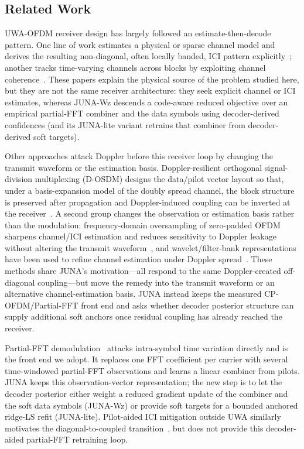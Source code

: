 \documentclass[journal]{IEEEtran}
\newcommand{\juna}{JUNA}
\newcommand{\junalite}{JUNA-lite}
\newcommand{\junawz}{JUNA-Wz}
\begin{document}
\subsection{Related Work}\label{sec:related}
UWA-OFDM receiver design has largely followed an estimate-then-decode pattern.
One line of work estimates a physical or sparse channel model and derives the
resulting non-diagonal, often locally banded, ICI pattern
explicitly~\cite{berger2010sparse}; another tracks time-varying channels across
blocks by exploiting channel coherence~\cite{zwang2012clustered}. These papers
explain the physical source of the problem studied here, but they are not the
same receiver architecture: they seek explicit channel or ICI estimates, whereas
\junawz{} descends a code-aware reduced objective over an empirical partial-FFT
combiner and the data symbols using decoder-derived confidences (and its
\junalite{}
variant retrains that combiner from decoder-derived soft targets).

Other approaches attack Doppler before this receiver loop by changing the
transmit waveform or the estimation basis. Doppler-resilient orthogonal
signal-division multiplexing (D-OSDM) designs the data/pilot vector layout so
that, under a basis-expansion model of the doubly spread channel, the block
structure is preserved after propagation and Doppler-induced coupling can be
inverted at the receiver~\cite{ebihara2016dosdm}. A second group changes the
observation or estimation basis rather than the modulation: frequency-domain
oversampling of zero-padded OFDM sharpens channel/ICI estimation and reduces
sensitivity to Doppler leakage without altering the transmit
waveform~\cite{wang2012fdoversampling}, and wavelet/filter-bank representations
have been used to refine channel estimation under Doppler
spread~\cite{tang2018haarwavelet}. These methods share \juna{}'s
motivation---all respond to the same Doppler-created off-diagonal coupling---but
move the remedy into the transmit waveform or an alternative channel-estimation
basis. \juna{} instead keeps the measured CP-OFDM/Partial-FFT front end and asks
whether decoder posterior structure can supply additional soft anchors once
residual coupling has already reached the receiver.

Partial-FFT demodulation~\cite{yerramalli2012partialfft} attacks intra-symbol
time variation directly and is the front end we adopt. It replaces one FFT
coefficient per carrier with several time-windowed partial-FFT observations and learns a
linear combiner from pilots. \juna{} keeps this observation-vector representation; the new
step is to let the decoder posterior either weight a reduced gradient update of
the combiner and the soft data symbols (\junawz{}) or provide soft targets for a
bounded anchored ridge-LS refit (\junalite{}). Pilot-aided ICI mitigation outside UWA
similarly motivates the diagonal-to-coupled transition~\cite{mostofi2005ici},
but does not provide this decoder-aided partial-FFT retraining loop.
\end{document}
